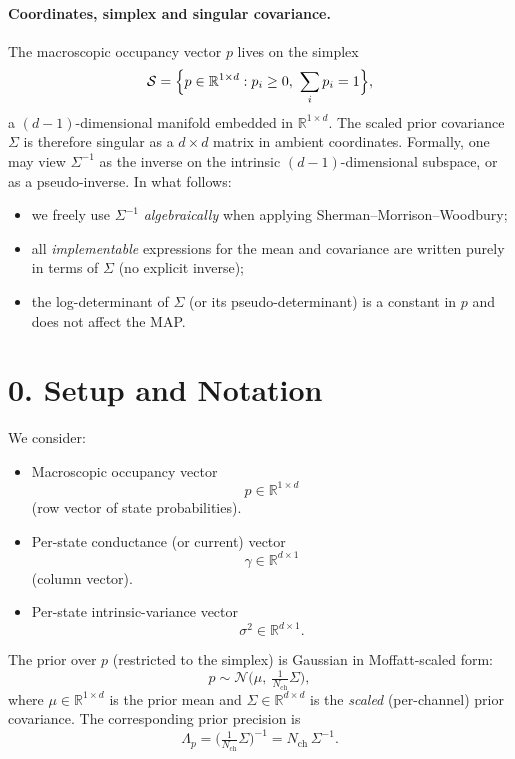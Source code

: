 \documentclass[11pt]{article}
\begin{document}
\paragraph{Coordinates, simplex and singular covariance.}
The macroscopic occupancy vector $p$ lives on the simplex
\[
  \mathcal{S} = \Bigl\{p \in \mathbb{R}^{1\times d} :
    p_i \ge 0,\ \sum_i p_i = 1\Bigr\},
\]
a $(d-1)$-dimensional manifold embedded in $\mathbb{R}^{1\times d}$.
The scaled prior covariance $\Sigma$ is therefore singular as a
$d\times d$ matrix in ambient coordinates.  Formally, one may view
$\Sigma^{-1}$ as the inverse on the intrinsic $(d-1)$-dimensional
subspace, or as a pseudo-inverse.  In what follows:
\begin{itemize}
  \item we freely use $\Sigma^{-1}$ \emph{algebraically}
        when applying Sherman--Morrison--Woodbury;
  \item all \emph{implementable} expressions for the mean and
        covariance are written purely in terms of $\Sigma$ (no
        explicit inverse);
  \item the log-determinant of $\Sigma$ (or its pseudo-determinant)
        is a constant in $p$ and does not affect the MAP.
\end{itemize}

\section*{0. Setup and Notation}

We consider:
\begin{itemize}
  \item Macroscopic occupancy vector
    \[
      p \in \mathbb{R}^{1\times d}
    \]
    (row vector of state probabilities).
  \item Per-state conductance (or current) vector
    \[
      \gamma \in \mathbb{R}^{d\times 1}
    \]
    (column vector).
  \item Per-state intrinsic-variance vector
    \[
      \sigma^2 \in \mathbb{R}^{d\times 1}.
    \]
\end{itemize}

The prior over $p$ (restricted to the simplex) is Gaussian in
Moffatt-scaled form:
\[
  p \sim \mathcal{N}\!\bigl(\mu,\ \tfrac{1}{N_{\text{ch}}}\Sigma\bigr),
\]
where $\mu \in \mathbb{R}^{1\times d}$ is the prior mean and
$\Sigma \in \mathbb{R}^{d\times d}$ is the \emph{scaled} (per-channel)
prior covariance.  The corresponding prior precision is
\[
  \Lambda_p
  = \bigl(\tfrac{1}{N_{\text{ch}}}\Sigma\bigr)^{-1}
  = N_{\text{ch}}\,\Sigma^{-1}.
\]
\end{document}
